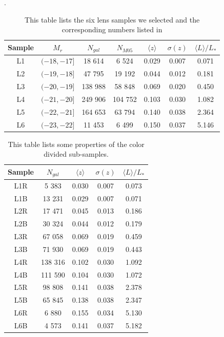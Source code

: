 \documentclass[apj]{emulateapj}
\begin{document}
\begin{table}[h!]
\begin{center}
 \caption{\label{tab:tbl-1} This table lists the six lens samples we
    selected and the corresponding numbers listed in
    \citet{Mandelbaum2005}}.
\begin{tabular}{ccccccc}
\hline
Sample & $M_r$ & $N_{gal}$ & $N_{M05}$ & $\langle z \rangle $ & $\sigma(z)$ & $\langle L \rangle/L_*$\\
\hline
L1  & $(-18,-17]$  & 18 614  & 6 524   & 0.029 & 0.007  & 0.071 \\
L2  & $(-19,-18]$  & 47 795  & 19 192  & 0.044 & 0.012  & 0.181 \\
L3  & $(-20,-19]$  & 138 988 & 58 848  & 0.069 & 0.020  & 0.450 \\
L4  & $(-21,-20]$  & 249 906 & 104 752 & 0.103 & 0.030  & 1.082 \\
L5  & $(-22,-21]$  & 164 653 & 63 794  & 0.140 & 0.038  & 2.364 \\
L6  & $(-23,-22]$  & 11 453  & 6 499   & 0.150 & 0.037  & 5.146 \\
\hline
\end{tabular}
\end{center}
\end{table}


\begin{table}[h!]
 \caption{\label{tab:tbl-2} This table lists some properties of the color
    divided sub-samples.}
\begin{tabular}{ccccc}
\hline
Sample & $N_{gal}$ & $\langle z \rangle $ & $\sigma(z)$ & $\langle L \rangle/L_*$\\
\hline
L1R   & 5 383   & 0.030  & 0.007  & 0.073 \\
L1B   & 13 231  & 0.029  & 0.007  & 0.071 \\
L2R   & 17 471  & 0.045  & 0.013  & 0.186 \\
L2B   & 30 324  & 0.044  & 0.012  & 0.179 \\
L3R   & 67 058  & 0.069  & 0.019  & 0.459 \\
L3B   & 71 930  & 0.069  & 0.019  & 0.443 \\
L4R   & 138 316 & 0.102  & 0.030  & 1.092 \\
L4B   & 111 590 & 0.104  & 0.030  & 1.072 \\
L5R   & 98 808  & 0.141  & 0.038  & 2.378 \\
L5B   & 65 845  & 0.138  & 0.038  & 2.347 \\
L6R   & 6 880   & 0.155  & 0.034  & 5.130 \\
L6B   & 4 573   & 0.141  & 0.037  & 5.182 \\
\hline
\end{tabular}
\end{table}
\end{document}
